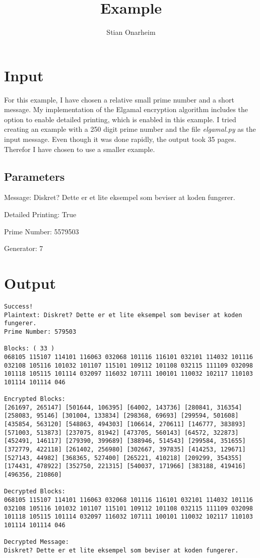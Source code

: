 \documentclass{article}
\title{Example}
\author{Stian Onarheim}
\begin{document}
\maketitle

\section{Input}
For this example, I have chosen a relative small prime number and a short message. My implementation of the Elgamal encryption algorithm includes the option to enable detailed printing, which is enabled in this example. I tried creating an example with a 250 digit prime number and the file \textit{elgamal.py} as the input message. Even though it was done rapidly, the output took 35 pages. Therefor I have chosen to use a smaller example.

\subsection{Parameters}
Message: Diskret? Dette er et lite eksempel som beviser at koden fungerer.

Detailed Printing: True

Prime Number: 5579503 

Generator: 7

\newpage
\section{Output}

\begin{lstlisting}
Success!
Plaintext: Diskret? Dette er et lite eksempel som beviser at koden fungerer.
Prime Number: 579503 

Blocks: ( 33 )
068105 115107 114101 116063 032068 101116 116101 032101 114032 101116 032108 105116 101032 101107 115101 109112 101108 032115 111109 032098 101118 105115 101114 032097 116032 107111 100101 110032 102117 110103 101114 101114 046 

Encrypted Blocks:
[261697, 265147] [501644, 106395] [64002, 143736] [280841, 316354] [258083, 95146] [301004, 133834] [298368, 69693] [299594, 501608] [435854, 563120] [548863, 494303] [106614, 270611] [146777, 383893] [571003, 513873] [237075, 81942] [473705, 560143] [64572, 322873] [452491, 146117] [279390, 399689] [388946, 514543] [299584, 351655] [372779, 422118] [261402, 256980] [302667, 397835] [414253, 129671] [527143, 44982] [368365, 527400] [265221, 410218] [209299, 354355] [174431, 478922] [352750, 221315] [540037, 171966] [383188, 419416] [496356, 210860] 

Decrypted Blocks:
068105 115107 114101 116063 032068 101116 116101 032101 114032 101116 032108 105116 101032 101107 115101 109112 101108 032115 111109 032098 101118 105115 101114 032097 116032 107111 100101 110032 102117 110103 101114 101114 046 

Decrypted Message: 
Diskret? Dette er et lite eksempel som beviser at koden fungerer.
\end{lstlisting}
\end{document}
